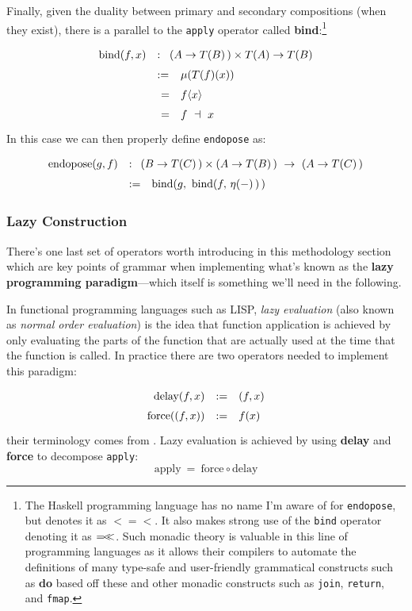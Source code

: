 \documentclass[twoside]{article}
\newcommand{\strong}[1]{{\bfseries #1}}
\newcommand{\apply}{\mbox{apply}}
\newcommand{\delay}{\mbox{delay}}
\newcommand{\force}{\mbox{force}}
\newcommand{\ndopose}{\mbox{endopose}}
\newcommand{\bind}{\mbox{bind}}
\newcommand{\Hrbind}{\ensuremath{=\!<\hspace{-1ex}<}}
\newcommand{\Hrfish}{\ensuremath{<\!=\!<}}
\begin{document}
Finally, given the duality between primary and secondary compositions (when they exist),
there is a parallel to the \texttt{apply} operator called \strong{bind}:\footnote{The Haskell programming language has no
name I'm aware of for \texttt{endopose}, but denotes it as $ \Hrfish $. It also makes strong use of the \texttt{bind}
operator denoting it as $ \Hrbind $. Such monadic theory is valuable in this line of programming languages as it allows
their compilers to automate the definitions of many type-safe and user-friendly grammatical constructs such as \strong{do}
based off these and other monadic constructs such as \texttt{join}, \texttt{return}, and \texttt{fmap}.}
$$ \def\arraystretch{1.5}
\begin{array}{rll}
\bind(f, x)	& :  & \hspace{-1em}(A\to T(B)\,)\times T(A) \to T(B)		\\
		& := & \mu(T(f)(x))						\\
		& \ = & f\langle x\rangle					\\
		& \ = & f\ \dashv\ x
\end{array} $$
In this case we can then properly define \texttt{endopose} as:
$$ \def\arraystretch{1.5}
\begin{array}{rll}
\ndopose(g, f)	& :  & \hspace{-1em}(B\to T(C)\,)\times (A\to T(B)\,)\ \to\ (A\to T(C)\,)		\\
		& := & \bind(g,\ \bind(f,\,\eta(-)\,)\,)
\end{array} $$

\subsubsection*{Lazy Construction}

There's one last set of operators worth introducing in this methodology section which are key points of grammar when
implementing what's known as the \strong{lazy programming paradigm}---which itself is something we'll need in the following.

In functional programming languages such as LISP, \emph{lazy evaluation} (also known as \emph{normal order evaluation})
is the idea that function application is achieved by only evaluating the parts of the function that are actually
used at the time that the function is called. In practice there are two operators needed to implement this paradigm:
$$ \def\arraystretch{1.5}
\begin{array}{rrl}
\delay(f, x)		& := & (f, x)				\\
\force((f, x))		& := & f(x)
\end{array} $$
their terminology comes from \cite{sicp}. Lazy evaluation is achieved by using \strong{delay} and \strong{force}
to decompose \texttt{apply}:
$$ \apply \ =\ \force \circ \delay $$
\end{document}
